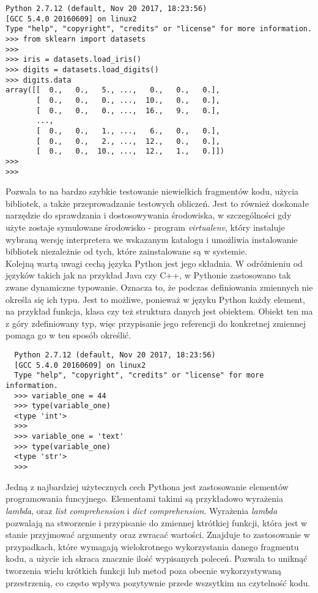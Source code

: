 \begin{lstlisting}
Python 2.7.12 (default, Nov 20 2017, 18:23:56) 
[GCC 5.4.0 20160609] on linux2
Type "help", "copyright", "credits" or "license" for more information. 
>>> from sklearn import datasets
>>> 
>>> iris = datasets.load_iris()
>>> digits = datasets.load_digits()
>>> digits.data
array([[  0.,   0.,   5., ...,   0.,   0.,   0.],
       [  0.,   0.,   0., ...,  10.,   0.,   0.],
       [  0.,   0.,   0., ...,  16.,   9.,   0.],
       ..., 
       [  0.,   0.,   1., ...,   6.,   0.,   0.],
       [  0.,   0.,   2., ...,  12.,   0.,   0.],
       [  0.,   0.,  10., ...,  12.,   1.,   0.]])
>>>
>>>
\end{lstlisting}

Pozwala to na bardzo szybkie testowanie niewielkich fragmentów kodu, użycia bibliotek, a także przeprowadzanie testowych obliczeń.
Jest to również doskonałe narzędzie do sprawdzania i dostosowywania środowiska, w szczególności gdy użyte zostaje symulowane środowisko - program \textit{virtualenv}, 
który instaluje wybraną wersję interpretera we wskazanym katalogu i umożliwia instalowanie bibliotek niezależnie od tych, które zainstalowane są w systemie.\\

Kolejną wartą uwagi cechą języka Python jest jego składnia. W odróżnieniu od języków takich jak na przykład Java czy C++, w Pythonie zastosowano tak zwane dynamiczne typowanie.
Oznacza to, że podczas definiowania zmiennych nie określa się ich typu. Jest to możliwe, ponieważ w języku Python każdy element, na przykład funkcja, klasa czy też struktura danych jest obiektem.
Obiekt ten ma z góry zdefiniowany typ, więc przypisanie jego referencji do konkretnej zmiennej pomaga go w ten sposób określić.
\begin{lstlisting}
  Python 2.7.12 (default, Nov 20 2017, 18:23:56) 
  [GCC 5.4.0 20160609] on linux2
  Type "help", "copyright", "credits" or "license" for more information.
  >>> variable_one = 44
  >>> type(variable_one)
  <type 'int'>
  >>> 
  >>> variable_one = 'text'
  >>> type(variable_one)
  <type 'str'>
  >>> 
\end{lstlisting}

Jedną z najbardziej użytecznych cech Pythona jest zastosowanie elementów programowania funcyjnego. Elementami takimi są przykładowo wyrażenia \textit{lambda}, oraz \textit{list comprehension} i \textit{dict comprehension}.
Wyrażenia \textit{lambda} pozwalają na stworzenie i przypisanie do zmiennej ktrótkiej funkcji, która jest w stanie przyjmować argumenty oraz zwracać wartości.
Znajduje to zastosowanie w przypadkach, które wymagają wielokrotnego wykorzystania danego fragmentu kodu, a użycie ich skraca znacznie ilość wypisanych poleceń.
Pozwala to uniknąć tworzenia wielu krótkich funkcji lub metod poza obecnie wykorzystywaną przestrzenią, co często wpływa pozytywnie przede wszsytkim na czytelność kodu.

